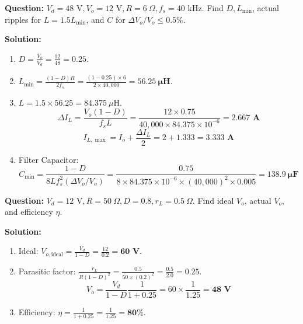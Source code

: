 \documentclass[11pt,a4paper]{article}
\begin{document}
\begin{examplebox}
\textbf{Question:} $V_d = 48\text{ V}, V_o = 12\text{ V}, R = 6\ \Omega, f_s = 40\text{ kHz}$. Find $D, L_{\min}$, actual ripples for $L = 1.5 L_{\min}$, and $C$ for $\Delta V_o / V_o \le 0.5\%$.

\tcbline
\textbf{Solution:}
\begin{enumerate}[leftmargin=*]
  \item $D = \frac{V_o}{V_d} = \frac{12}{48} = \mathbf{0.25}$.
  \item $L_{\min} = \frac{(1 - D) R}{2 f_s} = \frac{(1 - 0.25) \times 6}{2 \times 40,000} = \mathbf{56.25\ \mu\text{H}}$.
  \item $L = 1.5 \times 56.25 = 84.375\ \mu\text{H}$.
  \[
  \Delta I_L = \frac{V_o (1 - D)}{f_s L} = \frac{12 \times 0.75}{40,000 \times 84.375 \times 10^{-6}} = \mathbf{2.667\text{ A}}
  \]
  \[
  I_{L,\max} = I_o + \frac{\Delta I_L}{2} = 2 + 1.333 = \mathbf{3.333\text{ A}}
  \]
  \item Filter Capacitor:
  \[
  C_{\min} = \frac{1 - D}{8 L f_s^2 (\Delta V_o / V_o)} = \frac{0.75}{8 \times 84.375 \times 10^{-6} \times (40,000)^2 \times 0.005} = \mathbf{138.9\ \mu\text{F}}
  \]
\end{enumerate}
\end{examplebox}

\begin{examplebox}
\textbf{Question:} $V_d = 12\text{ V}, R = 50\ \Omega, D = 0.8, r_L = 0.5\ \Omega$. Find ideal $V_o$, actual $V_o$, and efficiency $\eta$.

\tcbline
\textbf{Solution:}
\begin{enumerate}[leftmargin=*]
  \item Ideal: $V_{o,\text{ideal}} = \frac{V_d}{1 - D} = \frac{12}{0.2} = \mathbf{60\text{ V}}$.
  \item Parasitic factor: $\frac{r_L}{R (1 - D)^2} = \frac{0.5}{50 \times (0.2)^2} = \frac{0.5}{2.0} = 0.25$.
  \[
  V_o = \frac{V_d}{1 - D} \frac{1}{1 + 0.25} = 60 \times \frac{1}{1.25} = \mathbf{48\text{ V}}
  \]
  \item Efficiency: $\eta = \frac{1}{1 + 0.25} = \frac{1}{1.25} = \mathbf{80\%}$.
\end{enumerate}
\end{examplebox}
\end{document}
